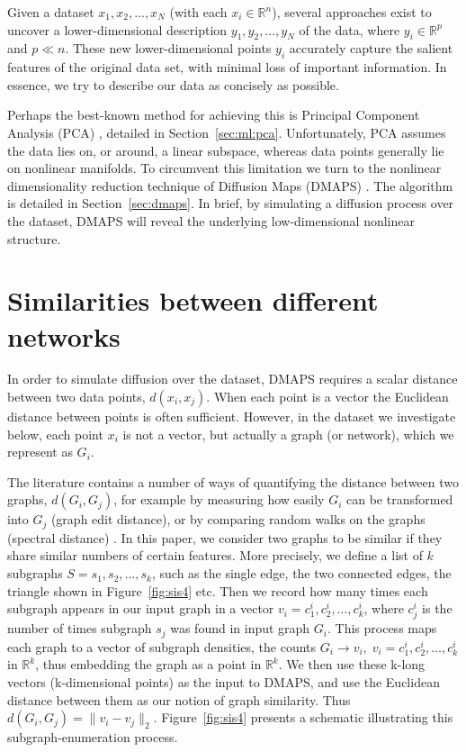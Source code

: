 Given a dataset ${x_1, x_2, \dots, x_N}$ (with each
$x_i \in \mathbb{R}^n$), several approaches exist to uncover a
lower-dimensional description ${y_1, y_2, \dots, y_N}$ of the data,
where $y_i \in \mathbb{R}^p$ and $p \ll n$. These new
lower-dimensional points $y_i$ accurately capture the salient features
of the original data set, with minimal loss of important
information. In essence, we try to describe our data as concisely as
possible.

Perhaps the best-known method for achieving this is Principal
Component Analysis (PCA) \cite{jolliffe_principal_2014}, detailed in
Section~\ref{sec:ml:pca}. Unfortunately, PCA assumes the data lies on,
or around, a linear subspace, whereas data points generally lie on
nonlinear manifolds. To circumvent this limitation we turn to the
nonlinear dimensionality reduction technique of Diffusion Maps (DMAPS)
\cite{coifman_diffusion_2006}. The algorithm is detailed in
Section~\ref{sec:dmaps}. In brief, by simulating a diffusion process
over the dataset, DMAPS will reveal the underlying low-dimensional
nonlinear structure.

\section{Similarities between different networks}

In order to simulate diffusion over the dataset, DMAPS requires a
scalar distance between two data points, $d(x_i, x_j)$. When each
point is a vector the Euclidean distance between points is often
sufficient. However, in the dataset we investigate below, each point
$x_i$ is not a vector, but actually a graph (or network), which we
represent as $G_i$.

The literature contains a number of ways of quantifying the distance
between two graphs, $d(G_i, G_j)$, for example by measuring how easily
$G_i$ can be transformed into $G_j$ (graph edit distance), or by
comparing random walks on the graphs (spectral distance)
\cite{bunke_graph_1998,gao_survey_2010,papadimitriou_web_2010,vishwanathan_graph_2010}. In
this paper, we consider two graphs to be similar if they share similar
numbers of certain features. More precisely, we define a list of $k$
subgraphs $S = {s_1, s_2, \dots, s_k}$, such as the single edge, the
two connected edges, the triangle shown in Figure~\ref{fig:sis4} etc. Then we
record how many times each subgraph appears in our input graph in a
vector $v_i = {c_1^i, c_2^i, \dots, c_k^i}$, where $c_j^i$ is the
number of times subgraph $s_j$ was found in input graph $G_i$. This
process maps each graph to a vector of subgraph densities, the counts
$G_i \rightarrow v_i, \; v_i = {c_1^i, c_2^i, \dots, c_k^i}$ in
$\mathbb{R}^k$, thus embedding the graph as a point in
$\mathbb{R}^k$. We then use these k-long vectors (k-dimensional
points) as the input to DMAPS, and use the Euclidean distance between
them as our notion of graph similarity. Thus
$d(G_i, G_j) = \| v_i - v_j \|_2$. Figure~\ref{fig:sis4} presents a schematic
illustrating this subgraph-enumeration process.


